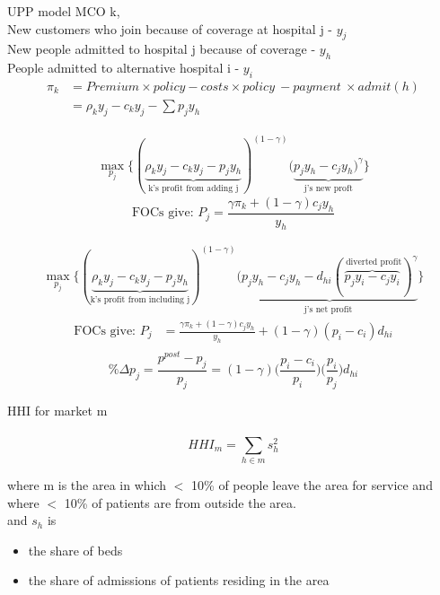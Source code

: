 \documentclass{beamer}
\begin{document}
\begin{frame}{UPP model}
MCO k, \\
New customers who join because of coverage at hospital j - $y_j$ \\
New people admitted to hospital j because of coverage - $y_h$ \\
People admitted to alternative hospital i - $y_i$
\begin{align*}
\pi_k & = Premium \times policy - costs \times policy\  - payment\ \times admit (h) \\
    & = \rho_{k} y_{j} - c_ky_{j} - \sum p_{j} y_{h} 
\end{align*}

\begin{align*}
\max_{p_j} \{ ( \underbrace{ \rho_{k}y_{j} - c_ky_{j} - p_jy_{h}}_{\text{k's profit from adding j}})^{(1-\gamma)}( \underbrace{ p_{j}y_{h}-c_{j}y_{h})^{\gamma} }_{\text{j's new proft}} \}
\end{align*}
\begin{equation*}
\text{FOCs give:    }        P_j = \frac{\gamma \pi_k+(1-\gamma)c_jy_{h}}{y_{h}} 
\end{equation*}
\end{frame}
\begin{frame}

\begin{align*}
    \max_{p_j} \{ ( \underbrace{ \rho_{k}y_{j} - c_ky_{j} - p_jy_{h}}_{\text{k's profit from including j}})^{(1-\gamma)}( \underbrace{ p_{j}y_{h}-c_{j}y_{h} - d_{hi}( \overbrace{p_{j}y_{i}-c_{j}y_{i} }^{\text{ diverted profit}})^{\gamma} }_{\text{j's net profit }} \}
\end{align*}
\begin{align*}
\text{FOCs give:    }        P_j & = \frac{\gamma \pi_k+(1-\gamma)c_jy_{h}} {y_{h}} + (1-\gamma)(p_i - c_i)d_{hi} \\
\end{align*}
$$
\%\Delta p_j = \frac{p^{post} - p_j}{p_j} = (1-\gamma)\bigg( \frac{p_i-c_i}{p_i} \bigg) \bigg( \frac{p_i}{p_j} \bigg) d_{hi}
$$
\end{frame}
\begin{frame}{HHI}
for market m \\
\\
$$HHI_m = \sum_{h \in m} s_h^2$$

where m is the area in which $<$ 10\% of people leave the area for service and where $<$ 10\% of patients are from outside the area.\\

and $s_h$ is 
\begin{itemize}
    \item the share of beds
    \item the share of admissions of patients residing in the area
\end{itemize}

\end{frame}
\end{document}
